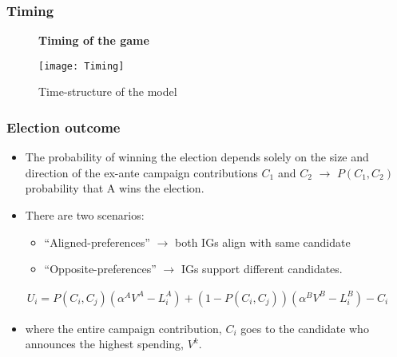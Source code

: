 \documentclass[handout,final,xcolor=dvipsnames]{beamer}
\begin{document}
  
\begin{frame}\frametitle{Timing}
  \begin{figure}[ht]
\begin{center}
\textbf{Timing of the game}
\end{center}
\centering
    \texttt{[image: Timing]}
  \caption{\small Time-structure of the model
  }
  \label{figure1}
\vspace{ 5 mm}
\end{figure}
  \end{frame}


  \begin{frame}\frametitle{Election outcome}
  \begin{itemize}\itemsep 10pt
  \item The probability of winning the election depends solely on the
    size and direction of the ex-ante campaign contributions $C_1$ and
    $C_2$ $\longrightarrow$ $P(C_1,C_2)$ probability that A wins the
    election. 
  \item There are two scenarios:
    \begin{itemize}\itemsep 5pt
    \item ``Aligned-preferences'' $\longrightarrow$ both IGs align with same candidate
      \item ``Opposite-preferences'' $\longrightarrow$ IGs support
        different candidates. 
      \end{itemize}
    \end{itemize}
      \begin{eqnarray}\label{u}
U_i = P(C_i, C_j) \left(\alpha^A V^A - L^A_i \right) + \left(1 - P(C_i, C_j)\right) \left( \alpha^B V^B - L^B_i  \right) - C_i   
\end{eqnarray}
  \begin{itemize}\itemsep 10pt
  \item where the entire campaign contribution, $C_i$ goes to the
    candidate who announces the highest spending, $V^k$. 
    \end{itemize}
  \end{frame}
\end{document}
